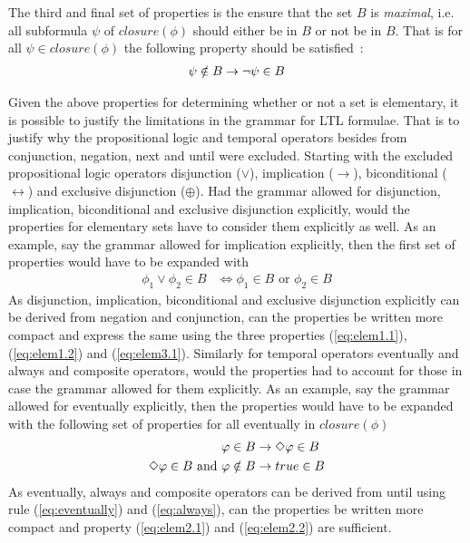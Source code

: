 The third and final set of properties is the ensure that the set $B$ is \emph{maximal}, i.e. all subformula $\psi$ of $closure(\phi)$ should either be in $B$ or not be in $B$. That is for all $\psi \in closure(\phi)$ the following property should be satisfied~\cite{baier2008principles}:
\begin{align}
    \psi \notin B \rightarrow \lnot \psi \in B \label{eq:elem3.1}
\end{align}

Given the above properties for determining whether or not a set is elementary, it is possible to justify the limitations in the grammar for LTL formulae. That is to justify why the propositional logic and temporal operators besides from conjunction, negation, next and until were excluded. Starting with the excluded propositional logic operators disjunction ($\lor$), implication ($\to$), biconditional ($\leftrightarrow$) and exclusive disjunction ($\oplus$). Had the grammar allowed for disjunction, implication, biconditional and exclusive disjunction explicitly, would the properties for elementary sets have to consider them explicitly as well. As an example, say the grammar allowed for implication explicitly, then the first set of properties would have to be expanded with
\begin{align*}
    \phi_1 \lor \phi_2 \in B &\Leftrightarrow \phi_1 \in B \text{ or } \phi_2 \in B
\end{align*}
As disjunction, implication, biconditional and exclusive disjunction explicitly can be derived from negation and conjunction, can the properties be written more compact and express the same using the three properties (\ref{eq:elem1.1}), (\ref{eq:elem1.2}) and (\ref{eq:elem3.1}). Similarly for temporal operators eventually and always and composite operators, would the properties had to account for those in case the grammar allowed for them explicitly. As an example, say the grammar allowed for eventually explicitly, then the properties would have to be expanded with the following set of properties for all eventually in $closure(\phi)$
\begin{align*}
    \varphi \in B &\rightarrow \Diamond \varphi \in B \\
    \Diamond \varphi \in B \text{ and } \varphi \notin B &\rightarrow true \in B \label{eq:elem2.2}
\end{align*}
As eventually, always and composite operators can be derived from until using rule (\ref{eq:eventually}) and (\ref{eq:always}), can the properties be written more compact and property (\ref{eq:elem2.1}) and (\ref{eq:elem2.2}) are sufficient.

